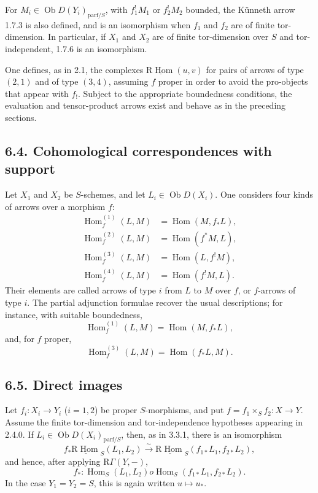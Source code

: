 \documentclass[12pt]{article}
\newcommand{\Hom}{\operatorname{Hom}}
\newcommand{\ob}{\operatorname{Ob}}
\newcommand{\R}{\mathrm R}
\begin{document}
For $M_i\in\ob D(Y_i)_{\mathrm{parf}/S}$, with $f_1^!M_1$ or $f_2^!M_2$ bounded, the Künneth arrow 1.7.3 is also defined, and is an isomorphism when $f_1$ and $f_2$ are of finite tor-dimension. In particular, if $X_1$ and $X_2$ are of finite tor-dimension over $S$ and tor-independent, 1.7.6 is an isomorphism.

One defines, as in 2.1, the complexes $\underline{\R\Hom}(u,v)$ for pairs of arrows of type $(2,1)$ and of type $(3,4)$, assuming $f$ proper in order to avoid the pro-objects that appear with $f_!$. Subject to the appropriate boundedness conditions, the evaluation and tensor-product arrows exist and behave as in the preceding sections.

\subsection*{6.4. Cohomological correspondences with support}
Let $X_1$ and $X_2$ be $S$-schemes, and let $L_i\in\ob D(X_i)$. One considers four kinds of arrows over a morphism $f$:
\begin{align}
   \Hom_f^{(1)}(L,M)&=\Hom(M,f_*L),       \tag{6.4.1}\\
   \Hom_f^{(2)}(L,M)&=\Hom(f^*M,L),       \tag{6.4.2}\\
   \Hom_f^{(3)}(L,M)&=\Hom(L,f^!M),       \tag{6.4.3}\\
   \Hom_f^{(4)}(L,M)&=\Hom(f^!M,L).       \tag{6.4.4}
\end{align}
Their elements are called arrows of type $i$ from $L$ to $M$ over $f$, or $f$-arrows of type $i$. The partial adjunction formulae recover the usual descriptions; for instance, with suitable boundedness,
\[
   \Hom_f^{(1)}(L,M)=\Hom(M,f_*L),
\]
and, for $f$ proper,
\[
   \Hom_f^{(3)}(L,M)=\Hom(f_*L,M).
\]

\subsection*{6.5. Direct images}
Let $f_i:X_i\to Y_i$ ($i=1,2$) be proper $S$-morphisms, and put $f=f_1\times_S f_2:X\to Y$. Assume the finite tor-dimension and tor-independence hypotheses appearing in 2.4.0. If $L_i\in\ob D(X_i)_{\mathrm{parf}/S}$, then, as in 3.3.1, there is an isomorphism
\begin{equation}
   f_*\underline{\R\Hom}_S(L_1,L_2)
      \xrightarrow{\sim}
   \underline{\R\Hom}_S(f_{1*}L_1,f_{2*}L_2),
   \tag{6.5.1}
\end{equation}
and hence, after applying $\R\Gamma(Y,-)$,
\begin{equation}
   f_*:\Hom_S(L_1,L_2)	o \Hom_S(f_{1*}L_1,f_{2*}L_2).
   \tag{6.5.2}
\end{equation}
In the case $Y_1=Y_2=S$, this is again written $u\mapsto u_*$.
\end{document}
